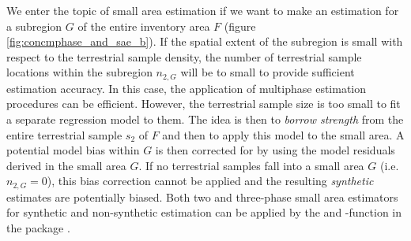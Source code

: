 \documentclass[article]{jss}
\begin{document}
We enter the topic of small area estimation if we want to make an estimation for a subregion $G$ of the entire inventory area $F$ (figure \ref{fig:concmphase_and_sae_b}). If the spatial extent of the subregion is small with respect to the terrestrial sample density, the number of terrestrial sample locations within the subregion $n_{2,G}$ will be to small to provide sufficient estimation accuracy. In this case, the application of multiphase estimation procedures can be efficient. However, the terrestrial sample size is too small to fit a separate regression model to them. The idea is then to \textit{borrow strength} from the entire terrestrial sample $s_2$ of $F$ and then to apply this  model to the small area. A potential model bias within $G$ is then corrected for by using the model residuals derived in the small area $G$. If no terrestrial samples fall into a small area $G$ (i.e. $n_{2,G}=0$), this bias correction cannot be applied and the resulting \textit{synthetic} estimates are potentially biased. Both two and three-phase small area estimators for synthetic and non-synthetic estimation can be applied by the  and -function in the  package .

\end{document}
